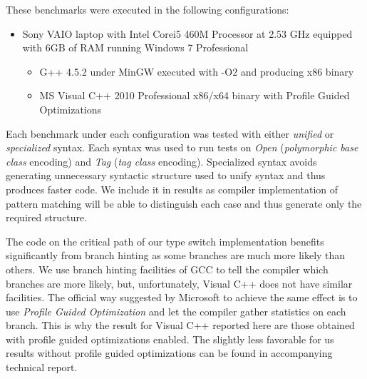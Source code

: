 These benchmarks were executed in the following configurations:

\begin{itemize}
\setlength{\itemsep}{0pt}
\setlength{\parskip}{0pt}
\item Sony VAIO\textsuperscript{\textregistered} laptop with Intel\textsuperscript{\textregistered} Core\texttrademark i5 460M 
      Processor at 2.53 GHz equipped with 6GB of RAM running Windows 7 
      Professional
      \begin{itemize}
      \setlength{\itemsep}{0pt}
      \setlength{\parskip}{0pt}
      \item G++ 4.5.2 under MinGW executed with -O2 and producing x86 binary
      \item MS Visual C++ 2010 Professional x86/x64 binary with Profile Guided Optimizations
      \end{itemize}
\end{itemize}

Each benchmark under each configuration was tested with either \emph{unified} 
or \emph{specialized} syntax. Each syntax was used to run tests on \emph{Open} 
(\emph{polymorphic base class} encoding) and \emph{Tag} (\emph{tag class} 
encoding). Specialized syntax avoids generating unnecessary syntactic structure 
used to unify syntax and thus produces faster code. We include it in results as 
compiler implementation of pattern matching will be able to distinguish each 
case and thus generate only the required structure.

The code on the critical path of our type switch implementation benefits 
significantly from branch hinting as some branches are much more likely than 
others. We use branch hinting facilities of GCC to tell the compiler which 
branches are more likely, but, unfortunately, Visual C++ does not have similar 
facilities. The official way suggested by Microsoft to achieve the same effect 
is to use \emph{Profile Guided Optimization} and let the compiler gather 
statistics on each branch. This is why the result for Visual C++ reported here 
are those obtained with profile guided optimizations enabled. The slightly less 
favorable for us results without profile guided optimizations can be found in 
accompanying technical report\cite{TR}.

